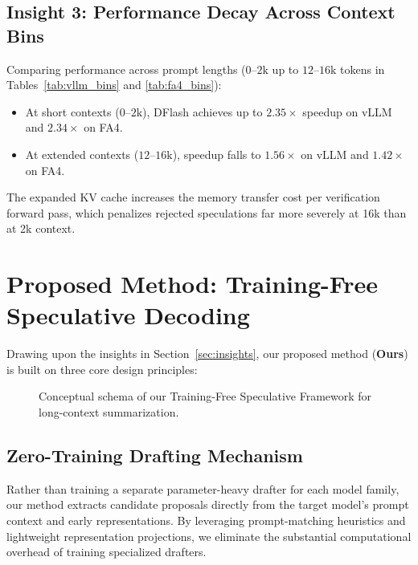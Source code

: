 \documentclass[11pt]{article}
\begin{document}
\subsection{Insight 3: Performance Decay Across Context Bins}
Comparing performance across prompt lengths ($0\text{--}2\text{k}$ up to $12\text{--}16\text{k}$ tokens in Tables~\ref{tab:vllm_bins} and \ref{tab:fa4_bins}):
\begin{itemize}
    \item At short contexts ($0\text{--}2\text{k}$), DFlash achieves up to $2.35\times$ speedup on vLLM and $2.34\times$ on FA4.
    \item At extended contexts ($12\text{--}16\text{k}$), speedup falls to $1.56\times$ on vLLM and $1.42\times$ on FA4.
\end{itemize}
The expanded KV cache increases the memory transfer cost per verification forward pass, which penalizes rejected speculations far more severely at 16k than at 2k context.

\section{Proposed Method: Training-Free Speculative Decoding}
\label{sec:method}

Drawing upon the insights in Section~\ref{sec:insights}, our proposed method (\textbf{Ours}) is built on three core design principles:

\begin{figure}[t]
\centering
{}
\caption{Conceptual schema of our Training-Free Speculative Framework for long-context summarization.}
\label{fig:framework}
\end{figure}

\subsection{Zero-Training Drafting Mechanism}
Rather than training a separate parameter-heavy drafter for each model family, our method extracts candidate proposals directly from the target model's prompt context and early representations. By leveraging prompt-matching heuristics and lightweight representation projections, we eliminate the substantial computational overhead of training specialized drafters.
\end{document}

